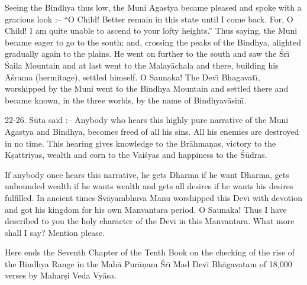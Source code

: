 Seeing the Bindhya thus low, the Muni Agastya became pleased and spoke with a gracious look :-- ``O Child! Better remain in this state until I come back. For, O Child! I am quite unable to ascend to your lofty heights.'' Thus saying, the Muni became eager to go to the south; and, crossing the peaks of the Bindhya, alighted gradually again to the plains. He went on further to the south and saw the \'Sr\={\i} \'Saila Mountain and at last went to the Malay\=achala and there, building his \=A\'srama (hermitage), settled himself. O Saunaka! The Dev\={\i} Bhagavat\={\i}, worshipped by the Muni went to the Bindhya Mountain and settled there and became known, in the three worlds, by the name of Bindhyav\=asin\={\i}.

22-26. S\=uta said :-- Anybody who hears this highly pure narrative of the Muni Agastya and Bindhya, becomes freed of all his sins. All his enemies are destroyed in no time. This hearing gives knowledge to the Br\=ahma\d{n}as, victory to the K\d{s}attriyas, wealth and corn to the Vai\'syas and happiness to the \'S\=udras.

If anybody once hears this narrative, he gets Dharma if he want Dharma, gets unbounded wealth if he wants wealth and gets all desires if he wants his desires fulfilled. In ancient times Sv\=ayambhuva Manu worshipped this Dev\={\i} with devotion and got his kingdom for his own Manvantara period. O Saunaka! Thus I have described to you the holy character of the Dev\={\i} in this Manvantara. What more shall I say? Mention please.

Here ends the Seventh Chapter of the Tenth Book on the checking of the rise of the Bindhya Range in the Mah\=a Pur\=a\d{n}am \'Sr\={\i} Mad Dev\={\i} Bh\=agavatam of 18,000 verses by Mahar\d{s}i Veda Vy\=asa.




